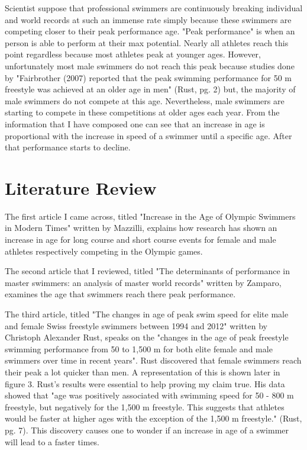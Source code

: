 \documentclass[letterpaper, 10 pt, conference]{ieeeconf}  %
\begin{document}
Scientist suppose that professional swimmers are continuously breaking individual and world records at such an immense rate simply because these swimmers are competing closer to their peak performance age. "Peak performance" is when an person is able to perform at their max potential. Nearly all athletes reach this point regardless because most athletes peak at younger ages. However, unfortunately most male swimmers do not reach this peak because studies done by "Fairbrother (2007) reported that the peak swimming performance for 50 m freestyle was achieved at an older age in men" (Rust, pg. 2) but, the majority of male swimmers do not compete at this age. Nevertheless, male swimmers are starting to compete in these competitions at older ages each year. From the information that I have composed one can see that an increase in age is proportional with the increase in speed of a swimmer until a specific age. After that performance starts to decline.

\section{Literature Review}
The first article I came across, titled "Increase in the Age of Olympic Swimmers in Modern Times" written by Mazzilli, explains how research has shown an increase in age for long course and short course events for female and male athletes respectively competing in the Olympic games. ~\cite{mazzilli_2017}

The second article that I reviewed, titled  "The determinants of performance in master swimmers: an analysis of master world records" written by Zamparo, examines the age that swimmers reach there peak performance. ~\cite{zamparo_gatta_prampero_2012}

The third article, titled "The changes in age of peak swim speed for elite male and female Swiss freestyle swimmers between 1994 and 2012" written by Christoph Alexander Rust, speaks on the "changes in the age of peak freestyle swimming performance from 50 to 1,500 m for both elite female and male swimmers over time in recent years". Rust discovered that female swimmers reach their peak a lot quicker than men. A representation of this is shown later in figure 3. Rust's results were essential to help proving my claim true. His data showed that "age was positively associated with swimming speed for 50 - 800 m freestyle, but negatively for the 1,500 m freestyle. This suggests that athletes would be faster at higher ages with the exception of the 1,500 m freestyle." (Rust, pg. 7). This discovery causes one to wonder if an increase in age of a swimmer will lead to a faster times. ~\cite{rüst_knechtle_rosemann_lepers_2013} 
\end{document}
